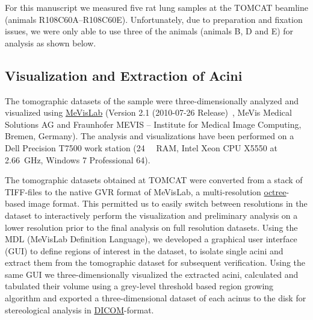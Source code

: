 \documentclass[%
	twoside,
	paper=a4,%
	abstract=true,%
	]{scrartcl}
\begin{document}
For this manuscript we measured five rat lung samples at the TOMCAT beamline (animals R108C60A--R108C60E). Unfortunately, due to preparation and fixation issues, we were only able to use three of the animals (animals B, D and E) for analysis as shown below.

\subsection{Visualization and Extraction of Acini}
The tomographic datasets of the sample were three-dimensionally analyzed and visualized using \href{http://mevislab.de}{MeVisLab} (Version 2.1 (2010-07-26 Release)~\cite{Bitter2007}, MeVis Medical Solutions AG and Fraunhofer MEVIS -- Institute for Medical Image Computing, Bremen, Germany). The analysis and visualizations have been performed on a Dell Precision T7500 work station (\SI{24}{\giga\byte} RAM, Intel Xeon CPU X5550 at \SI{2.66}{\giga\hertz}, Windows 7 Professional \SI{64}{\bit}). 

The tomographic datasets obtained at TOMCAT were converted from a stack of TIFF-files to the native GVR format of MeVisLab, a multi-resolution \href{https://secure.wikimedia.org/wikipedia/en/w/index.php?title=Octree&oldid=409131920}{octree}-based image format. This permitted us to easily switch between resolutions in the dataset to interactively perform the visualization and preliminary analysis on a lower resolution prior to the final analysis on full resolution datasets. Using the MDL (MeVisLab Definition Language), we developed a graphical user interface (GUI) to define regions of interest in the dataset, to isolate single acini and extract them from the tomographic dataset for subsequent verification. Using the same GUI we three-dimensionally visualized the extracted acini, calculated and tabulated their volume using a grey-level threshold based region growing algorithm and exported a three-dimensional dataset of each acinus to the disk for stereological analysis in \href{http://en.wikipedia.org/w/index.php?title=DICOM&oldid=511155074}{DICOM}-format.
\end{document}
